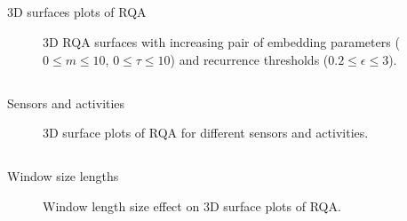 \subsection{}
{

\begin{frame}{3D surfaces plots of RQA}
    \begin{figure}
	\small
	\caption{
		3D RQA surfaces 
	with increasing pair of embedding parameters 
	($0 \le m \le 10$, $0 \le \tau \le 10$) 
	and recurrence thresholds ($ 0.2 \le \epsilon \le 3 $).
	} 
   \end{figure}
	
\end{frame}
}




\subsection{}
{

\begin{frame}{Sensors and activities}
    \begin{figure}
	\caption{3D surface plots of RQA for 
	different sensors and activities.} 
   \end{figure}
	
\end{frame}
}






\subsection{}
{

\begin{frame}{Window size lengths}
   \begin{figure}
	\caption{Window length size effect on 3D surface plots of RQA.} 
   \end{figure}
	
\end{frame}
}





